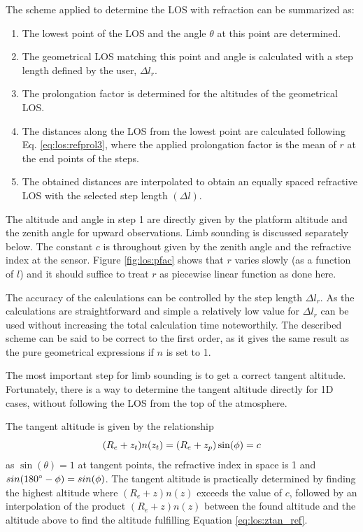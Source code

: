   The scheme applied to determine the LOS with refraction can be 
  summarized as:
  \begin{enumerate}
    \item The lowest point of the LOS and the angle $\theta$ at this point 
          are determined. 
    \item The geometrical LOS matching this point and angle is calculated
          with a step length defined by the user, $\Delta l_r$.
    \item The prolongation factor is determined for the altitudes of the
          geometrical LOS.
    \item The distances along the LOS from the lowest point are calculated
          following Eq. \ref{eq:los:refprol3}, where the applied prolongation
          factor is the mean of $r$ at the end points of the steps.
    \item The obtained distances are interpolated to obtain an equally spaced
          refractive LOS with the selected step length $(\Delta l)$.
  \end{enumerate}
  The altitude and angle in step 1 are directly given by the platform
  altitude and the zenith angle for upward observations. Limb sounding
  is discussed separately below. The constant $c$ is throughout given
  by the zenith angle and the refractive index at the sensor. Figure
  \ref{fig:los:pfac} shows that $r$ varies slowly (as a function of $l$) 
  and it should suffice to treat $r$ as piecewise linear function as
  done here. 

  The accuracy of the calculations can be controlled by the step length 
  $\Delta l_r$. As the calculations are straightforward and simple a
  relatively low value for $\Delta l_r$ can be used without increasing the
  total calculation time noteworthily. The described scheme can be said to 
  be correct to the first order, as it gives the same result as the pure
  geometrical expressions if $n$ is set to 1.

   
 
  The most important step for limb sounding is to get a correct
  tangent altitude. Fortunately, there is a way to determine the
  tangent altitude directly for 1D cases, without following the LOS
  from the top of the atmosphere.

  The tangent altitude is given by the relationship
  \begin{equation}
    (R_e+z_t)n(z_t) = (R_e+z_p)\sin(\phi) = c
   \label{eq:los:ztan_ref}
  \end{equation}
  as $\sin(\theta)=1$ at tangent points, the refractive index in space
  is 1 and $sin(180^{\circ}-\phi)=sin(\phi)$. The tangent altitude
  is practically determined by finding the highest altitude where
  $(R_e+z)n(z)$ exceeds the value of $c$, followed by an interpolation
  of the product $(R_e+z)n(z)$ between the found altitude and the
  altitude above to find the altitude fulfilling Equation
  \ref{eq:los:ztan_ref}.
  
